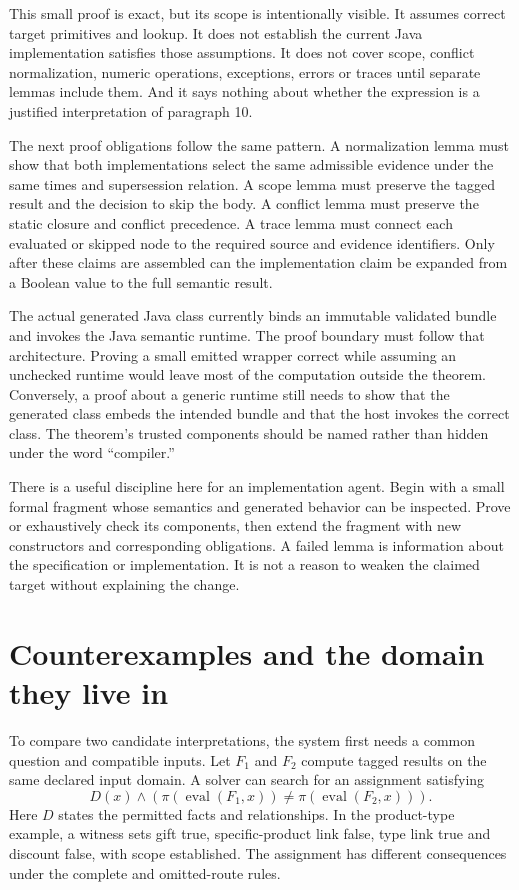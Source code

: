 \documentclass[12pt,a4paper,oneside,openany]{book}
\newcommand{\eval}{\operatorname{eval}}
\begin{document}
This small proof is exact, but its scope is intentionally visible. It assumes
correct target primitives and lookup. It does not establish the current Java
implementation satisfies those assumptions. It does not cover scope, conflict
normalization, numeric operations, exceptions, errors or traces until separate
lemmas include them. And it says nothing about whether the expression is a
justified interpretation of paragraph 10.

The next proof obligations follow the same pattern. A normalization lemma must
show that both implementations select the same admissible evidence under the
same times and supersession relation. A scope lemma must preserve the tagged
result and the decision to skip the body. A conflict lemma must preserve the
static closure and conflict precedence. A trace lemma must connect each
evaluated or skipped node to the required source and evidence identifiers.
Only after these claims are assembled can the implementation claim be expanded
from a Boolean value to the full semantic result.

The actual generated Java class currently binds an immutable validated bundle
and invokes the Java semantic runtime. The proof boundary must follow that
architecture. Proving a small emitted wrapper correct while assuming an
unchecked runtime would leave most of the computation outside the theorem.
Conversely, a proof about a generic runtime still needs to show that the
generated class embeds the intended bundle and that the host invokes the
correct class. The theorem's trusted components should be named rather than
hidden under the word ``compiler.''

There is a useful discipline here for an implementation agent. Begin with a
small formal fragment whose semantics and generated behavior can be inspected.
Prove or exhaustively check its components, then extend the fragment with new
constructors and corresponding obligations. A failed lemma is information
about the specification or implementation. It is not a reason to weaken the
claimed target without explaining the change.

\section{Counterexamples and the domain they live in}
\label{merge:M03:09}

\label{sec:proof-counterexamples}
To compare two candidate interpretations, the system first needs a common
question and compatible inputs. Let $F_1$ and $F_2$ compute tagged results on
the same declared input domain. A solver can search for an assignment satisfying
\begin{equation}
 D(x)\land\left(\pi(\eval(F_1,x))\ne
                         \pi(\eval(F_2,x))\right).
 \label{eq:difference-query}
\end{equation}
Here $D$ states the permitted facts and relationships. In the product-type
example, a witness sets gift true, specific-product link false, type link true
and discount false, with scope established. The assignment has different
consequences under the complete and omitted-route rules.
\end{document}
